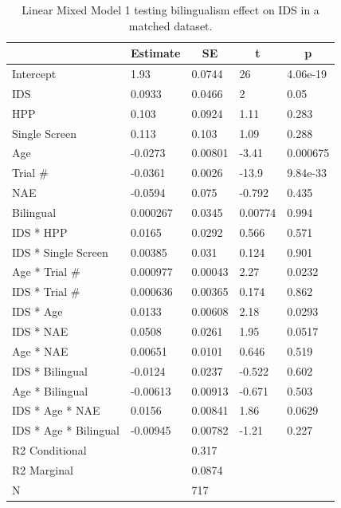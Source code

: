\documentclass[
  english,
  ,man,floatsintext]{apa6}
\begin{document}
\begin{table}[tbp]
\begin{center}
\begin{threeparttable}
\caption{\label{tab:unnamed-chunk-10}Linear Mixed Model 1 testing bilingualism effect on IDS in a matched dataset.}
\begin{tabular}{lllll}
\toprule
 & \multicolumn{1}{c}{Estimate} & \multicolumn{1}{c}{SE} & \multicolumn{1}{c}{t} & \multicolumn{1}{c}{p}\\
\midrule
Intercept & 1.93 & 0.0744 & 26 & 4.06e-19\\
IDS & 0.0933 & 0.0466 & 2 & 0.05\\
HPP & 0.103 & 0.0924 & 1.11 & 0.283\\
Single Screen & 0.113 & 0.103 & 1.09 & 0.288\\
Age & -0.0273 & 0.00801 & -3.41 & 0.000675\\
Trial \# & -0.0361 & 0.0026 & -13.9 & 9.84e-33\\
NAE & -0.0594 & 0.075 & -0.792 & 0.435\\
Bilingual & 0.000267 & 0.0345 & 0.00774 & 0.994\\
IDS * HPP & 0.0165 & 0.0292 & 0.566 & 0.571\\
IDS * Single Screen & 0.00385 & 0.031 & 0.124 & 0.901\\
Age * Trial \# & 0.000977 & 0.00043 & 2.27 & 0.0232\\
IDS * Trial \# & 0.000636 & 0.00365 & 0.174 & 0.862\\
IDS * Age & 0.0133 & 0.00608 & 2.18 & 0.0293\\
IDS * NAE & 0.0508 & 0.0261 & 1.95 & 0.0517\\
Age * NAE & 0.00651 & 0.0101 & 0.646 & 0.519\\
IDS * Bilingual & -0.0124 & 0.0237 & -0.522 & 0.602\\
Age * Bilingual & -0.00613 & 0.00913 & -0.671 & 0.503\\
IDS * Age * NAE & 0.0156 & 0.00841 & 1.86 & 0.0629\\
IDS * Age * Bilingual & -0.00945 & 0.00782 & -1.21 & 0.227\\ \midrule
R2 Conditional &  & 0.317 &  & \\
R2 Marginal &  & 0.0874 &  & \\ \midrule
N &  & 717 &  & \\
\bottomrule
\end{tabular}
\end{threeparttable}
\end{center}
\end{table}
\end{document}
